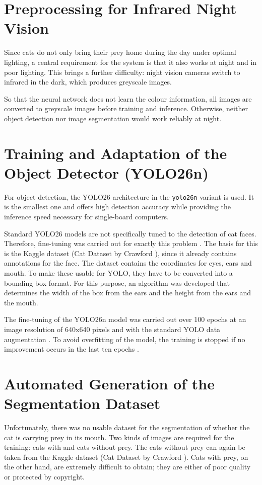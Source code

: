 \section{Preprocessing for Infrared Night Vision}
Since cats do not only bring their prey home during the day under optimal lighting, a central requirement for the system is that it also works at night and in poor lighting. This brings a further difficulty: night vision cameras switch to infrared in the dark, which produces greyscale images.

So that the neural network does not learn the colour information, all images are converted to greyscale images before training and inference. Otherwise, neither object detection nor image segmentation would work reliably at night.

\section{Training and Adaptation of the Object Detector (YOLO26n)}
For object detection, the YOLO26 architecture in the \texttt{yolo26n} variant is used. It is the smallest one and offers high detection accuracy while providing the inference speed necessary for single-board computers.

Standard YOLO26 models are not specifically tuned to the detection of cat faces. Therefore, fine-tuning was carried out for exactly this problem \cite{yosinski2014transferable}. The basis for this is the Kaggle dataset (Cat Dataset by Crawford \cite{kaggle2024cat}), since it already contains annotations for the face. The dataset contains the coordinates for eyes, ears and mouth. To make these usable for YOLO, they have to be converted into a bounding box format. For this purpose, an algorithm was developed that determines the width of the box from the ears and the height from the ears and the mouth.

The fine-tuning of the YOLO26n model was carried out over 100 epochs at an image resolution of 640x640 pixels and with the standard YOLO data augmentation \cite{ultralytics_augmentation}. To avoid overfitting of the model, the training is stopped if no improvement occurs in the last ten epochs \cite{goodfellow2016deep}.

\section{Automated Generation of the Segmentation Dataset}
Unfortunately, there was no usable dataset for the segmentation of whether the cat is carrying prey in its mouth. Two kinds of images are required for the training: cats with and cats without prey. The cats without prey can again be taken from the Kaggle dataset (Cat Dataset by Crawford \cite{kaggle2024cat}). Cats with prey, on the other hand, are extremely difficult to obtain; they are either of poor quality or protected by copyright.

